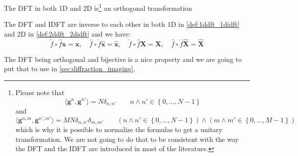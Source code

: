 \begin{Prop}
    The \ac{DFT} in both 1D and 2D is\footnote{Please note that \begin{equation}
        \langle\boldsymbol{g}^n,\boldsymbol{g}^{n'}\rangle= N \delta_{n,n'} \qquad n \land n'\in \left\{0,\ldots,N-1\right\}
    \end{equation} and   \begin{equation}
        \langle\boldsymbol{g}^{n,m},\boldsymbol{g}^{n',m'}\rangle= MN \delta_{n,n'}\delta_{m,m'} \qquad (n \land n' \in \left\{0,\ldots,N-1\right\}) \land (m \land m' \in \left\{0,\ldots,M-1\right\})
    \end{equation} which is why it is possible to normalize the formulas to get a unitary transformation. We are not going to 
    do that to be consistent with the way the \ac{DFT} and the \ac{IDFT} are introduced in most of the literature.} an orthogonal transformation   
\end{Prop}
\begin{Thm}\label{theorem:dft_idft_inverse}
    The \ac{DFT} and \ac{IDFT} are inverse to each other in both 1D in \cref{def:1ddft_1didft} and 2D in \cref{def:2ddft_2didft}  and we have:
    \begin{equation}
        \check f  \circ \hat f \boldsymbol{x} = \boldsymbol{x}, \quad \hat f  \circ \check f \hat {\boldsymbol{x}} = \hat {\boldsymbol{x}}, \quad \check f  \circ \hat f \boldsymbol{X} = \boldsymbol{X}, \quad \hat f  \circ \check f \hat {\boldsymbol{X}} = \hat {\boldsymbol{X}}
    \end{equation}
\end{Thm}
\begin{Rem}
    The \ac{DFT} being orthogonal and bijective is a nice property and we are going to put that to use in \cref{sec:diffraction_imaging}. 
\end{Rem}



























